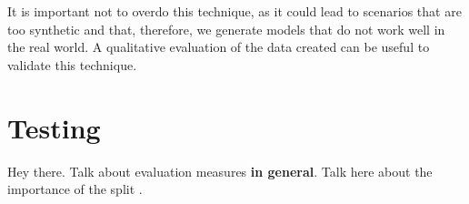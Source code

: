 \begin{remarkBox}
  It is important not to overdo this technique, as it could lead to scenarios
  that are too synthetic and that, therefore, we generate models that do not
  work well in the real world. A qualitative evaluation of the data created can
  be useful to validate this technique.
\end{remarkBox}



\section{Testing}
Hey there. Talk about evaluation measures \textbf{in general}. Talk here about
the importance of the split .
